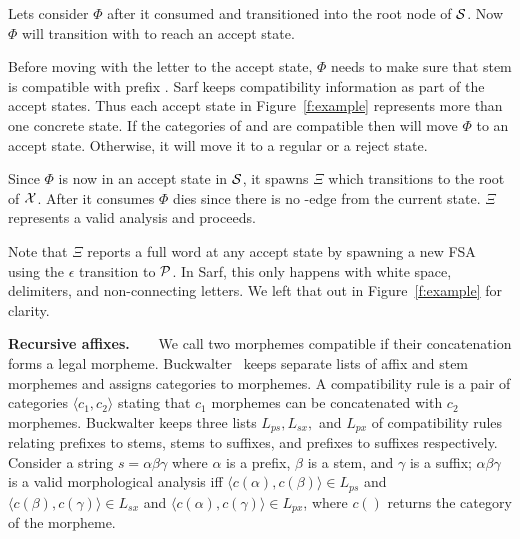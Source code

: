 \documentclass[11pt]{article}
\newcommand{\noTrRL}[1]{\transfalse\RL{#1}\transtrue}
\newcommand{\noTrnoVocRL}[1]{\transfalse\novocalize\noTrRL{#1}\vocalize\transtrue}
\begin{document}
Lets consider $\Phi$ after it consumed \noTrnoVocRL{wsy} 
and transitioned into the root node of ${\cal S}$.
Now $\Phi$ will transition with \noTrnoVocRL{l`b} to reach an accept 
state. 

Before moving with the letter \noTrnoVocRL{b} to the accept state,
$\Phi$ needs to make sure that %
stem \noTrnoVocRL{l`b} is compatible
with %
prefix \noTrnoVocRL{wsy}. 
Sarf keeps compatibility information as part
of the accept states. 
Thus each accept state in Figure~\ref{f:example} represents
more than one concrete state. 
If the categories of \noTrnoVocRL{l`b} and \noTrnoVocRL{wsy} are compatible
then \noTrnoVocRL{b} will move $\Phi$ to an accept state. 
Otherwise, it will move it to a regular or a reject state. 
       
Since $\Phi$ is now in an accept state in ${\cal S}$, it 
spawns $\Xi$ which transitions to the root of ${\cal X}$. 
After it consumes \noTrnoVocRL{h--} $\Phi$ dies since there is no
\noTrnoVocRL{h--}-edge from the current state.
$\Xi$ represents a valid analysis and proceeds.
       
Note that $\Xi$ reports a full word at any accept state
by spawning a new FSA using the $\epsilon$ transition
to ${\cal P}$.
In Sarf, this only happens with white space, delimiters, 
and non-connecting letters. 
We left that out in Figure~\ref{f:example} for clarity. 
       

{\bf Recursive affixes.~~~}
We call two morphemes compatible if their concatenation
forms a legal morpheme. 
Buckwalter~ keeps separate lists 
of affix and stem morphemes and assigns categories to
morphemes. 
A compatibility rule is a pair of categories 
$\langle c_1, c_2\rangle$  stating that $c_1$ morphemes
can be concatenated with $c_2$ morphemes.
Buckwalter keeps three lists $L_{ps}, L_{sx},$ and $L_{px}$ 
of compatibility rules relating
prefixes to stems, stems to suffixes, and prefixes to suffixes
respectively. 
Consider a string $s=\alpha\beta\gamma$ where $\alpha$ is 
a prefix, $\beta$ is a stem, and $\gamma$ is a suffix;
$\alpha\beta\gamma$ is a 
valid morphological analysis iff
$\langle c(\alpha),c(\beta)\rangle \in L_{ps}$ and
$\langle c(\beta),c(\gamma)\rangle \in L_{sx}$ and
$\langle c(\alpha),c(\gamma)\rangle \in L_{px}$, where
$c()$ returns the category of the morpheme.
\end{document}
